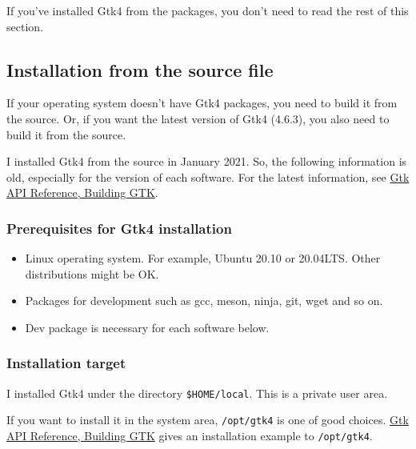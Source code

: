 If you've installed Gtk4 from the packages, you don't need to read the
rest of this section.

\hypertarget{installation-from-the-source-file}{%
\subsection{Installation from the source
file}\label{installation-from-the-source-file}}

If your operating system doesn't have Gtk4 packages, you need to build
it from the source. Or, if you want the latest version of Gtk4 (4.6.3),
you also need to build it from the source.

I installed Gtk4 from the source in January 2021. So, the following
information is old, especially for the version of each software. For the
latest information, see
\href{https://docs.gtk.org/gtk4/building.html}{Gtk API Reference,
Building GTK}.

\hypertarget{prerequisites-for-gtk4-installation}{%
\subsubsection{Prerequisites for Gtk4
installation}\label{prerequisites-for-gtk4-installation}}

\begin{itemize}
\tightlist
\item
  Linux operating system. For example, Ubuntu 20.10 or 20.04LTS. Other
  distributions might be OK.
\item
  Packages for development such as gcc, meson, ninja, git, wget and so
  on.
\item
  Dev package is necessary for each software below.
\end{itemize}

\hypertarget{installation-target}{%
\subsubsection{Installation target}\label{installation-target}}

I installed Gtk4 under the directory
\passthrough{\lstinline!$HOME/local!}. This is a private user area.

If you want to install it in the system area,
\passthrough{\lstinline!/opt/gtk4!} is one of good choices.
\href{https://docs.gtk.org/gtk4/building.html}{Gtk API Reference,
Building GTK} gives an installation example to
\passthrough{\lstinline!/opt/gtk4!}.

